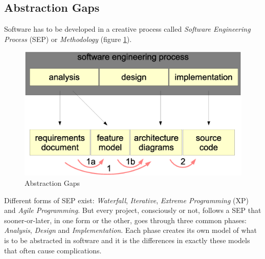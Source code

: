 %
%
%
%
%
%
%

\subsection{Abstraction Gaps}
\label{abstraction_gaps_heading}

Software has to be developed in a creative process called
\emph{Software Engineering Process} (SEP) or \emph{Methodology} (figure
\ref{gaps_figure}).

\begin{figure}[htb]
    \begin{center}
        \includegraphics[scale=0.2]{vector/gaps.eps}
        \caption{Abstraction Gaps}
        \label{gaps_figure}
    \end{center}
\end{figure}

Different forms of SEP exist: \emph{Waterfall}, \emph{Iterative},
\emph{Extreme Programming} (XP) and \emph{Agile Programming}. But every
project, consciously or not, follows a SEP that sooner-or-later, in one form or
the other, goes through three common phases: \emph{Analysis}, \emph{Design} and
\emph{Implementation}. Each phase creates its own model of what is to be
abstracted in software and it is the differences in exactly these models that
often cause complications.

